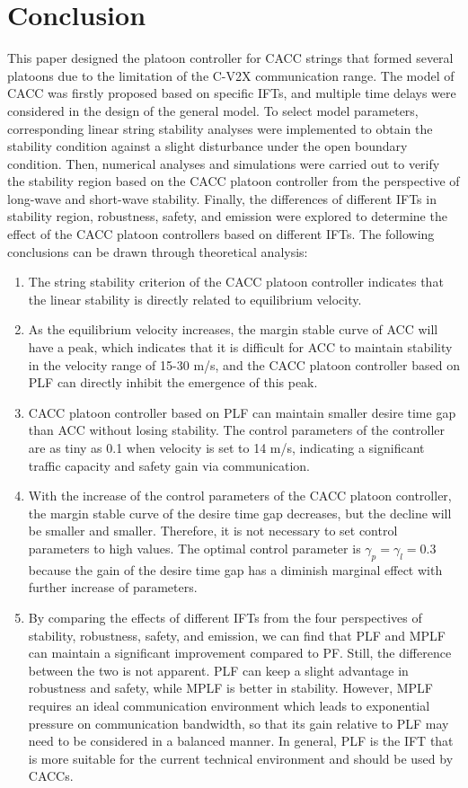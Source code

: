\documentclass[journal]{IEEEtran}
\begin{document}
\section{Conclusion}
\label{Section 6}
This paper designed the platoon controller for CACC strings that formed several platoons due to the limitation of the C-V2X communication range. The model of CACC was firstly proposed based on specific IFTs, and multiple time delays were considered in the design of the general model. To select model parameters, corresponding linear string stability analyses were implemented to obtain the stability condition against a slight disturbance under the open boundary condition. Then, numerical analyses and simulations were carried out to verify the stability region based on the CACC platoon controller from the perspective of long-wave and short-wave stability. Finally, the differences of different IFTs in stability region, robustness, safety, and emission were explored to determine the effect of the CACC platoon controllers based on different IFTs. The following conclusions can be drawn through theoretical analysis:
\begin{enumerate}
	\item The string stability criterion of the CACC platoon controller indicates that the linear stability is directly related to equilibrium velocity.
	\item As the equilibrium velocity increases, the margin stable curve of ACC will have a peak, which indicates that it is difficult for ACC to maintain stability in the velocity range of 15-30 m/s, and the CACC platoon controller based on PLF can directly inhibit the emergence of this peak.
	\item CACC platoon controller based on PLF can maintain smaller desire time gap than ACC without losing stability. The control parameters of the controller are as tiny as 0.1 when velocity is set to 14 m/s, indicating a significant traffic capacity and safety gain via communication.
	\item With the increase of the control parameters of the CACC platoon controller, the margin stable curve of the desire time gap decreases, but the decline will be smaller and smaller. Therefore, it is not necessary to set control parameters to high values. The optimal control parameter is $\gamma_p=\gamma_l=0.3$ because the gain of the desire time gap has a diminish marginal effect with further increase of parameters.
	\item By comparing the effects of different IFTs from the four perspectives of stability, robustness, safety, and emission, we can find that PLF and MPLF can maintain a significant improvement compared to PF. Still, the difference between the two is not apparent. PLF can keep a slight advantage in robustness and safety, while MPLF is better in stability. However, MPLF requires an ideal communication environment which leads to exponential pressure on communication bandwidth, so that its gain relative to PLF may need to be considered in a balanced manner. In general, PLF is the IFT that is more suitable for the current technical environment and should be used by CACCs.
\end{enumerate}
\end{document}
